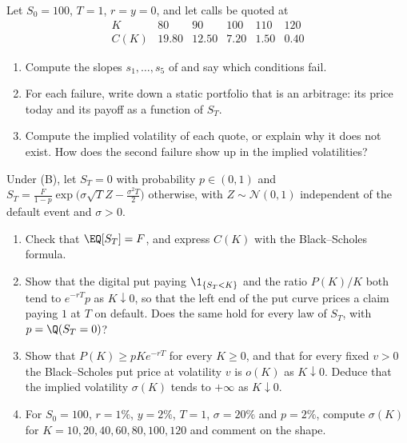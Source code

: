 \begin{exercise}\label{ex:sk-quotes}
\easy Let $S_0=100$, $T=1$, $r=y=0$, and let calls be quoted at
\[
  \begin{array}{c|ccccc}
    K & 80 & 90 & 100 & 110 & 120\\\hline
    C(K) & 19.80 & 12.50 & 7.20 & 1.50 & 0.40
  \end{array}
\]
\begin{enumerate}[label=(\alph*)]
  \item Compute the slopes $s_1,\dots,s_5$ of  and say which conditions fail.
  \item For each failure, write down a static portfolio that is an arbitrage: its price today and its
    payoff as a function of $S_T$.
  \item Compute the implied volatility of each quote, or explain why it does not exist. How does the
    second failure show up in the implied volatilities?
\end{enumerate}
\end{exercise}

\begin{exercise}\label{ex:sk-default}
\medium Under (B), let $S_T=0$ with probability $p\in(0,1)$ and $S_T=\frac{F}{1-p}\exp\big(\sigma\sqrt TZ-\frac{\sigma^2T}2\big)$
otherwise, with $Z\sim\mathcal N(0,1)$ independent of the default event and $\sigma>0$.
\begin{enumerate}[label=(\alph*)]
  \item Check that $\EQ[S_T]=F$, and express $C(K)$ with the Black--Scholes formula.
  \item Show that the digital put paying $\1_{\{S_T<K\}}$ and the ratio $P(K)/K$ both tend to $e^{-rT}p$ as
    $K\downarrow0$, so that the left end of the put curve prices a claim paying $1$ at $T$ on default. Does the
    same hold for every law of $S_T$, with $p=\Q(S_T=0)$?
  \item Show that $P(K)\ge pKe^{-rT}$ for every $K\ge0$, and that for every fixed $v>0$ the
    Black--Scholes put price at volatility $v$ is $o(K)$ as $K\downarrow0$. Deduce that the implied
    volatility $\sigma(K)$ tends to $+\infty$ as $K\downarrow0$.
  \item For $S_0=100$, $r=1\%$, $y=2\%$, $T=1$, $\sigma=20\%$ and $p=2\%$, compute $\sigma(K)$ for
    $K=10,20,40,60,80,100,120$ and comment on the shape.
\end{enumerate}
\end{exercise}

